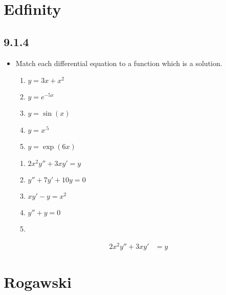 \documentclass{nosvagor-notes}
\begin{document}
\chapter{Edfinity}

\section{9.1.4}
\begin{itemize}
  \item Match each differential equation to a function which is a solution.
    \begin{multicols}{2}
      \begin{enumerate}[label=\Alph*.]
        \item \( y = 3x + x^2 \)
        \item \( y = e^{-5x} \)
        \item \( y = \sin(x) \)
        \item \( y = x^{.5} \)
        \item \( y = \exp(6x) \)
      \end{enumerate}
      \begin{enumerate}
        \item \( 2x^2y'' + 3xy' = y \)
        \item  \( y'' + 7y' + 10y = 0 \)
        \item \( xy' - y = x^2 \)
        \item \( y'' + y = 0 \)
        \item []
      \end{enumerate}
    \end{multicols}

    \begin{align*}
       2x^2y'' + 3xy' &= y

    \end{align*}

\end{itemize}

\chapter{Rogawski}
\end{document}
